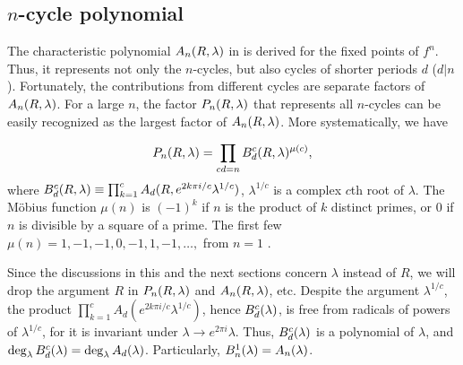 \documentclass{ws-ijbc}
\begin{document}
\subsection{\label{sec:primfac}$n$-cycle polynomial}


The characteristic polynomial $A_n(R, \lambda)$ in 
  is derived for the fixed points of $f^n$.
Thus, it represents not only the $n$-cycles,
  but also cycles of shorter periods $d$ ($d|n$).
%
Fortunately, the contributions from different cycles
  are separate factors of $A_n(R, \lambda)$.
For a large $n$,
  the factor $P_n(R, \lambda)$ that represents all $n$-cycles
  can be easily recognized
  as the largest factor of $A_n(R, \lambda)$.
%
More systematically, we have


  \begin{equation}
    P_n(R, \lambda)
    = \prod_{cd = n} B_d^c(R, \lambda)^{\mu(c)},
  \label{eq:primfac}
  \end{equation}
where
  $B_d^c(R, \lambda) \equiv \prod_{k=1}^c A_{d}(R, e^{2k\pi i/c} \lambda^{1/c})$,
  $\lambda^{1/c}$ is a complex $c$th root of $\lambda$.
%
%
%
The M\"obius function $\mu(n)$ is $(-1)^k$
  if $n$ is the product of $k$ distinct primes,
  or 0 if $n$ is divisible by a square of a prime.
The first few $\mu(n) = 1, -1, -1, 0, -1, 1, -1, \ldots,$
  from $n = 1$
 \cite{hardy}.
%



Since the discussions in this and the next sections
  concern $\lambda$ instead of $R$,
  we will drop the argument $R$ in $P_n(R, \lambda)$ and $A_n(R, \lambda)$, etc.
Despite the argument $\lambda^{1/c}$,
  the product $\prod_{k=1}^c A_d(e^{2k\pi i/c} \lambda^{1/c})$,
  hence $B_d^c(\lambda)$,
  is free from radicals of powers of $\lambda^{1/c}$,
  for it is invariant under $\lambda \rightarrow e^{2\pi i} \lambda$.
Thus, $B_d^c(\lambda)$ is a polynomial of $\lambda$,
and $\deg_\lambda B_d^c(\lambda) = \deg_\lambda A_d(\lambda)$.
Particularly, $B_n^1(\lambda) = A_n(\lambda)$.
%
\end{document}

